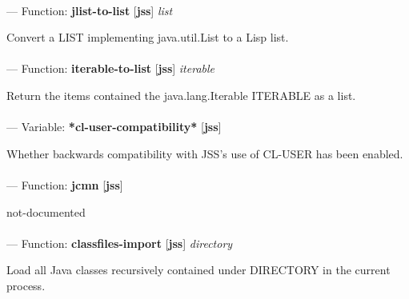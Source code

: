 \paragraph{}
\label{JSS:JLIST-TO-LIST}
--- Function: \textbf{jlist-to-list} [\textbf{jss}] \textit{list}

\begin{adjustwidth}{5em}{5em}
Convert a LIST implementing java.util.List to a Lisp list.
\end{adjustwidth}

\paragraph{}
\label{JSS:ITERABLE-TO-LIST}
--- Function: \textbf{iterable-to-list} [\textbf{jss}] \textit{iterable}

\begin{adjustwidth}{5em}{5em}
Return the items contained the java.lang.Iterable ITERABLE as a list.
\end{adjustwidth}

\paragraph{}
\label{JSS:*CL-USER-COMPATIBILITY*}
--- Variable: \textbf{*cl-user-compatibility*} [\textbf{jss}] \textit{}

\begin{adjustwidth}{5em}{5em}
Whether backwards compatibility with JSS's use of CL-USER has been enabled.
\end{adjustwidth}

\paragraph{}
\label{JSS:JCMN}
--- Function: \textbf{jcmn} [\textbf{jss}] \textit{}

\begin{adjustwidth}{5em}{5em}
not-documented
\end{adjustwidth}

\paragraph{}
\label{JSS:CLASSFILES-IMPORT}
--- Function: \textbf{classfiles-import} [\textbf{jss}] \textit{directory}

\begin{adjustwidth}{5em}{5em}
Load all Java classes recursively contained under DIRECTORY in the current process.
\end{adjustwidth}

